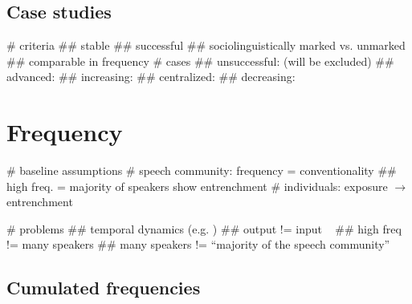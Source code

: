 \documentclass[
  a4paper,
  ]{scrartcl}
\begin{document}
  \subsection{Case studies}

    \begin{easylist}[itemize]
      # criteria
        ## stable
        ## successful
        ## sociolinguistically marked vs. unmarked
        ## comparable in frequency
      # cases \parencite{Kerremans2015}
        ## unsuccessful:  (will be excluded)
        ## advanced: 
        ## increasing: 
        ## centralized: 
        ## decreasing: 
    \end{easylist}

\section{Frequency}

  \begin{easylist}[itemize]

    # baseline assumptions
      # speech community: frequency = conventionality
        ## high freq. = majority of speakers show entrenchment
      # individuals: exposure $\rightarrow$ entrenchment

    # problems
      ## temporal dynamics (e.g. )
      ## output != input ~\parencite{Stefanowitsch2017}
      ## high freq != many speakers
      ## many speakers != \enquote{majority of the speech community}

  \end{easylist}

  \subsection{Cumulated frequencies}
\end{document}
